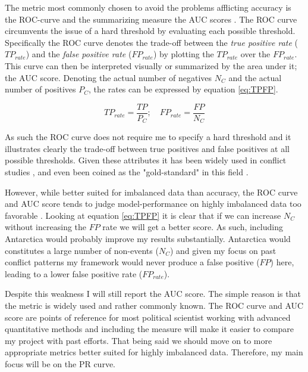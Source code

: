 \documentclass[a4paper]{article}
\begin{document}
The metric most commonly chosen to avoid the problems afflicting accuracy is the ROC-curve and the summarizing measure the AUC scores \citep[1277-1278]{He_2008}. The ROC curve circumvents the issue of a hard threshold by evaluating each possible threshold. Specifically the ROC curve denotes the trade-off between the \emph{true positive rate} ($TP_{rate}$) and the \emph{false positive rate} ($FP_{rate}$) by plotting the $TP_{rate}$ over the $FP_{rate}$. This curve can then be interpreted visually or summarized by the area under it; the AUC score\citep[1277-1278]{He_2008}. Denoting the actual number of negatives $N_C$ and the actual number of positives $P_C$, the rates can be expressed by equation \ref{eq:TPFP}.\par

\[
TP_{rate} = \frac{TP}{P_C};\quad FP_{rate}=\frac{FP}{N_C} \tag{15} \label{eq:TPFP}
\]

As such the ROC curve does not require me to specify a hard threshold and it illustrates clearly the trade-off between true positives and false positives at all possible thresholds. Given these attributes it has been widely used in conflict studies \citep[14]{chadefaux2017conflict}, and even been coined as the "gold-standard" in this field \citep[366]{perry_2013}. 

However, while better suited for imbalanced data than accuracy, the ROC curve and AUC score tends to judge model-performance on highly imbalanced data too favorable \citep[1278]{He_2008}. Looking at equation \ref{eq:TPFP} it is clear that if we can increase $N_C$ without increasing the $FP$ rate we will get a better score. As such, including Antarctica would probably improve my results substantially. Antarctica would constitutes a large number of non-events ($N_C$) and given my focus on past conflict patterns my framework would never produce a false positive ($FP$) here, leading to a lower false positive rate ($FP_{rate}$).\par

Despite this weakness I will still report the AUC score. The simple reason is that the metric is widely used and rather commonly known. The ROC curve and AUC score are points of reference for most political scientist working with advanced quantitative methods and including the measure will make it easier to compare my project with past efforts. That being said we should move on to more appropriate metrics better suited for highly imbalanced data. Therefore, my main focus will be on the PR curve.\par
\end{document}
